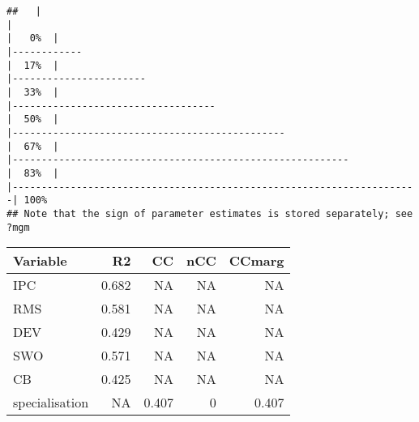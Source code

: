 \documentclass[
]{article}
\newenvironment{Shaded}{\begin{snugshade}}{\end{snugshade}}
\newcommand{\CommentTok}[1]{\textcolor[rgb]{0.56,0.35,0.01}{\textit{#1}}}
\newcommand{\DataTypeTok}[1]{\textcolor[rgb]{0.13,0.29,0.53}{#1}}
\newcommand{\KeywordTok}[1]{\textcolor[rgb]{0.13,0.29,0.53}{\textbf{#1}}}
\newcommand{\NormalTok}[1]{#1}
\newcommand{\OperatorTok}[1]{\textcolor[rgb]{0.81,0.36,0.00}{\textbf{#1}}}
\newcommand{\StringTok}[1]{\textcolor[rgb]{0.31,0.60,0.02}{#1}}
\begin{document}
\begin{verbatim}
##   |                                                                              |                                                                      |   0%  |                                                                              |------------                                                          |  17%  |                                                                              |-----------------------                                               |  33%  |                                                                              |-----------------------------------                                   |  50%  |                                                                              |-----------------------------------------------                       |  67%  |                                                                              |----------------------------------------------------------            |  83%  |                                                                              |----------------------------------------------------------------------| 100%
## Note that the sign of parameter estimates is stored separately; see ?mgm
\end{verbatim}

\begin{Shaded}
\end{Shaded}

\begin{longtable}[]{@{}lrrrr@{}}
\toprule
Variable & R2 & CC & nCC & CCmarg\tabularnewline
\midrule
\endhead
IPC & 0.682 & NA & NA & NA\tabularnewline
RMS & 0.581 & NA & NA & NA\tabularnewline
DEV & 0.429 & NA & NA & NA\tabularnewline
SWO & 0.571 & NA & NA & NA\tabularnewline
CB & 0.425 & NA & NA & NA\tabularnewline
specialisation & NA & 0.407 & 0 & 0.407\tabularnewline
\bottomrule
\end{longtable}
\end{document}
